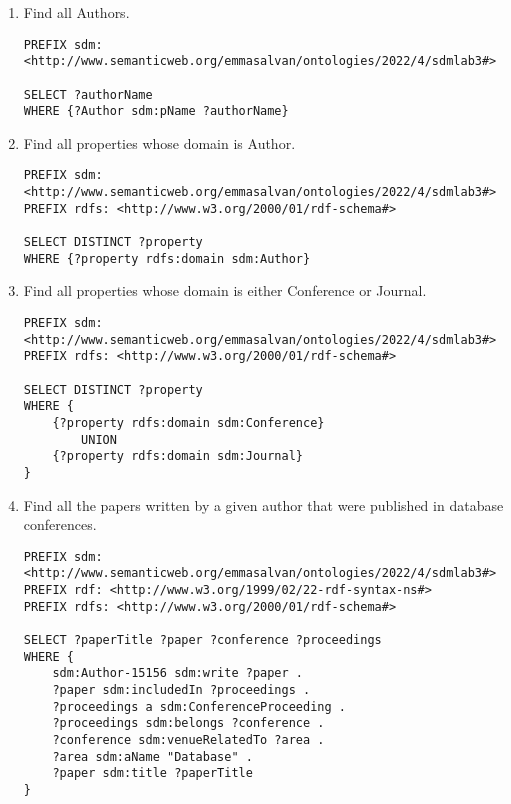 \begin{enumerate}
\item Find all Authors.
\begin{verbatim}
PREFIX sdm: <http://www.semanticweb.org/emmasalvan/ontologies/2022/4/sdmlab3#>

SELECT ?authorName
WHERE {?Author sdm:pName ?authorName}
\end{verbatim}
\item Find all properties whose domain is Author.
\begin{verbatim}
PREFIX sdm: <http://www.semanticweb.org/emmasalvan/ontologies/2022/4/sdmlab3#>
PREFIX rdfs: <http://www.w3.org/2000/01/rdf-schema#>

SELECT DISTINCT ?property
WHERE {?property rdfs:domain sdm:Author}
\end{verbatim}
\item Find all properties whose domain is either Conference or Journal.
\begin{verbatim}
PREFIX sdm: <http://www.semanticweb.org/emmasalvan/ontologies/2022/4/sdmlab3#>
PREFIX rdfs: <http://www.w3.org/2000/01/rdf-schema#>

SELECT DISTINCT ?property
WHERE {
    {?property rdfs:domain sdm:Conference}
        UNION 
    {?property rdfs:domain sdm:Journal}
}
\end{verbatim}
\item Find all the papers written by a given author that were published in database conferences.
\begin{verbatim}
PREFIX sdm: <http://www.semanticweb.org/emmasalvan/ontologies/2022/4/sdmlab3#>
PREFIX rdf: <http://www.w3.org/1999/02/22-rdf-syntax-ns#>
PREFIX rdfs: <http://www.w3.org/2000/01/rdf-schema#>

SELECT ?paperTitle ?paper ?conference ?proceedings
WHERE {
    sdm:Author-15156 sdm:write ?paper .
    ?paper sdm:includedIn ?proceedings .
    ?proceedings a sdm:ConferenceProceeding .
    ?proceedings sdm:belongs ?conference .
    ?conference sdm:venueRelatedTo ?area .
    ?area sdm:aName "Database" .
    ?paper sdm:title ?paperTitle
}
\end{verbatim}
\end{enumerate}


